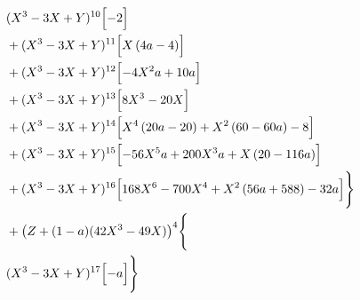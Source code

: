 \begin{align*}
&{}(X^3-3X+Y)^{10}\Bigl[- 2\Bigr]\\
&{}+(X^3-3X+Y)^{11}\Bigl[X \left(4 a - 4\right)\Bigr]\\
&{}+(X^3-3X+Y)^{12}\Bigl[- 4 X^{2} a + 10 a\Bigr]\\
&{}+(X^3-3X+Y)^{13}\Bigl[8 X^{3} - 20 X\Bigr]\\
&{}+(X^3-3X+Y)^{14}\Bigl[X^{4} \left(20 a - 20\right) + X^{2} \left(60 - 60 a\right) - 8\Bigr]\\
&{}+(X^3-3X+Y)^{15}\Bigl[- 56 X^{5} a + 200 X^{3} a + X \left(20 - 116 a\right)\Bigr]\\
&{}+(X^3-3X+Y)^{16}\Bigl[168 X^{6} - 700 X^{4} + X^{2} \left(56 a + 588\right) - 32 a\Bigr]\Biggr\}\\
&{}+\bigl(Z+(1-a)(42X^3-49X)\bigr)^{4}\Biggl\{\\
&{}(X^3-3X+Y)^{17}\Bigl[- a\Bigr]\Biggr\}
\end{align*}

\endgroup
